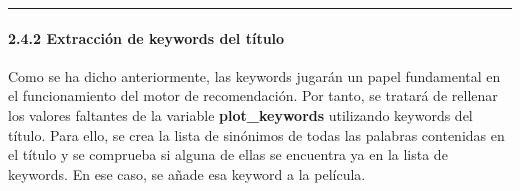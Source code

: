     \begin{center}\rule{0.5\linewidth}{0.5pt}\end{center}

\hypertarget{extracciuxf3n-de-keywords-del-tuxedtulo}{%
\paragraph{2.4.2 Extracción de keywords del
título}\label{extracciuxf3n-de-keywords-del-tuxedtulo}}

Como se ha dicho anteriormente, las keywords jugarán un papel
fundamental en el funcionamiento del motor de recomendación. Por tanto,
se tratará de rellenar los valores faltantes de la variable
\textbf{plot\_keywords} utilizando keywords del título. Para ello, se
crea la lista de sinónimos de todas las palabras contenidas en el título
y se comprueba si alguna de ellas se encuentra ya en la lista de
keywords. En ese caso, se añade esa keyword a la película.

